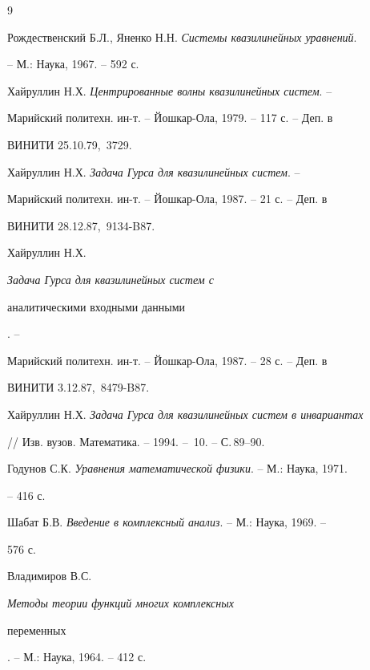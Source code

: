 \begin{thebibliography}{9}







Рождественский Б.Л., Яненко Н.Н. {\em Системы квазилинейных уравнений}.


-- М.: Наука, 1967. -- 592 с.




Хайруллин Н.Х. {\em Центрированные волны квазилинейных систем}. --


Марийский политехн. ин-т. -- Йошкар-Ола, 1979. -- 117 с. -- Деп. в


ВИНИТИ 25.10.79, \No\,3729.




Хайруллин Н.Х. {\em Задача Гурса для квазилинейных систем}. --


Марийский политехн. ин-т. -- Йошкар-Ола, 1987. -- 21 с. -- Деп. в


ВИНИТИ 28.12.87, \No\,9134-B87.




Хайруллин Н.Х. {\em Задача Гурса для квазилинейных систем с


аналитическими входными данными}. --


Марийский политехн. ин-т. -- Йошкар-Ола, 1987. -- 28 с. -- Деп. в


ВИНИТИ 3.12.87, \No\,8479-B87.




Хайруллин Н.Х. {\em Задача Гурса для квазилинейных систем в инвариантах}


// Изв. вузов. Математика. -- 1994. -- \No\,10. -- С.\,89--90.




Годунов С.К. {\em Уравнения математической физики}. -- М.: Наука, 1971.


-- 416 с.




Шабат Б.В. {\em Введение в комплексный анализ}. -- М.: Наука, 1969. --


576 с.




Владимиров В.С. {\em Методы теории функций многих комплексных


переменных}. -- М.: Наука, 1964. -- 412 с.





\end{thebibliography}





\vskip 2cm









\label{end}





